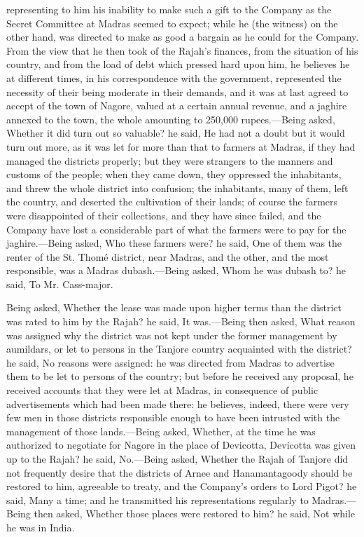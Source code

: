 representing to him his inability to make such a gift to the Company as the Secret Committee at Madras seemed to expect; while he (the witness) on the other hand, was directed to make as good a bargain as he could for the Company. From the view that he then took of the Rajah's finances, from the situation of his country, and from the load of debt which pressed hard upon him, he believes he at different times, in his correspondence with the government, represented the necessity of their being moderate in their demands, and it was at last agreed to accept of the town of Nagore, valued at a certain annual revenue, and a jaghire annexed to the town, the whole amounting to 250,000 rupees.—Being asked, Whether it did turn out so valuable? he said, He had not a doubt but it would turn out more, as it was let for more than that to farmers at Madras, if they had managed the districts properly; but they were strangers to the manners and customs of the people; when they came down, they oppressed the inhabitants, and threw the whole district into confusion; the inhabitants, many of them, left the country, and deserted the cultivation of their lands; of course the farmers were disappointed of their collections, and they have since failed, and the Company have lost a considerable part of what the farmers were to pay for the jaghire.—Being asked, Who these farmers were? he said, One of them was the renter of the St. Thomé district, near Madras, and the other, and the most responsible, was a Madras dubash.—Being asked, Whom he was dubash to? he said, To Mr. Cass-major.

Being asked, Whether the lease was made upon higher terms than the district was rated to him by the Rajah? he said, It was.—Being then asked, What reason was assigned why the district was not kept under the former management by aumildars, or let to persons in the Tanjore country acquainted with the district? he said, No reasons were assigned: he was directed from Madras to advertise them to be let to persons of the country; but before he received any proposal, he received accounts that they were let at Madras, in consequence of public advertisements which had been made there: he believes, indeed, there were very few men in those districts responsible enough to have been intrusted with the management of those lands.—Being asked, Whether, at the time he was authorized to negotiate for Nagore in the place of Devicotta, Devicotta was given up to the Rajah? he said, No.—Being asked, Whether the Rajah of Tanjore did not frequently desire that the districts of Arnee and Hanamantagoody should be restored to him, agreeable to treaty, and the Company's orders to Lord Pigot? he said, Many a time; and he transmitted his representations regularly to Madras.—Being then asked, Whether those places were restored to him? he said, Not while he was in India.

